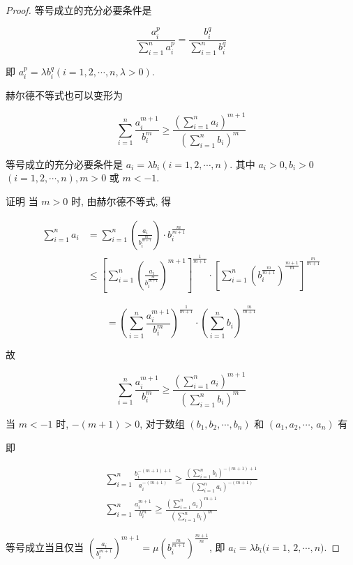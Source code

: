 \begin{proof}
	等号成立的充分必要条件是
	
	$$
	\frac{a_{i}^{p}}{\sum_{i=1}^{n} a_{i}^{p}}=\frac{b_{i}^{q}}{\sum_{i=1}^{n} b_{i}^{q}}
	$$
	
	即 $a_{i}^{p}=\lambda b_{i}^{q}(i=1,2, \cdots, n, \lambda>0)$.
	
	赫尔德不等式也可以变形为
	
	$$
	\sum_{i=1}^{n} \frac{a_{i}^{m+1}}{b_{i}^{m}} \geqslant \frac{\left(\sum_{i=1}^{n} a_{i}\right)^{m+1}}{\left(\sum_{i=1}^{n} b_{i}\right)^{m}}
	$$
	
	等号成立的充分必要条件是 $a_{i}=\lambda b_{i}(i=1,2, \cdots, n)$. 其中 $a_{i}>0, b_{i}>0$ $(i=1,2, \cdots, n), m>0$ 或 $m<-1$.
	
	证明 当 $m>0$ 时, 由赫尔德不等式, 得
	
	$$
	\begin{aligned}
	\sum_{i=1}^{n} a_{i} & =\sum_{i=1}^{n}\left(\frac{a_{i}}{b_{i}^{\frac{m}{m+1}}}\right) \cdot b_{i}^{\frac{m}{m+1}} \\
	& \leqslant\left[\sum_{i=1}^{n}\left(\frac{a_{i}}{b_{i}^{\frac{m}{m+1}}}\right)^{m+1}\right]^{\frac{1}{m+1}} \cdot\left[\sum_{i=1}^{n}\left(b_{i}^{\frac{m}{m+1}}\right)^{\frac{m+1}{m}}\right]^{\frac{m}{m+1}}
	\end{aligned}
	$$
	
	$$
	=\left(\sum_{i=1}^{n} \frac{a_{i}^{m+1}}{b_{i}^{m}}\right)^{\frac{1}{m+1}} \cdot\left(\sum_{i=1}^{n} b_{i}\right)^{\frac{m}{m+1}}
	$$
	
	故
	
	$$
	\sum_{i=1}^{n} \frac{a_{i}^{m+1}}{b_{i}^{m}} \geqslant \frac{\left(\sum_{i=1}^{n} a_{i}\right)^{m+1}}{\left(\sum_{i=1}^{n} b_{i}\right)^{m}}
	$$
	
	当 $m<-1$ 时, $-(m+1)>0$, 对于数组 $\left(b_{1}, b_{2}, \cdots, b_{n}\right)$ 和 $\left(a_{1}, a_{2}, \cdots\right.$, $\left.a_{n}\right)$ 有
	
	即
	
	$$
	\begin{gathered}
	\sum_{i=1}^{n} \frac{b_{i}^{-(m+1)+1}}{a_{i}^{-(m+1)}} \geqslant \frac{\left(\sum_{i=1}^{n} b_{i}\right)^{-(m+1)+1}}{\left(\sum_{i=1}^{n} a_{i}\right)^{-(m+1)}} \\
	\sum_{i=1}^{n} \frac{a_{i}^{m+1}}{b_{i}^{m}} \geqslant \frac{\left(\sum_{i=1}^{n} a_{i}\right)^{m+1}}{\left(\sum_{i=1}^{n} b_{i}\right)^{m}}
	\end{gathered}
	$$
	
	等号成立当且仅当 $\left(\frac{a_{i}}{b_{i}^{m+1}}\right)^{m+1}=\mu\left(b_{i}^{\frac{m}{m+1}}\right)^{\frac{m+1}{m}}$, 即 $a_{i}=\lambda b_{i}(i=1$, $2, \cdots, n)$.
	

\end{proof}
